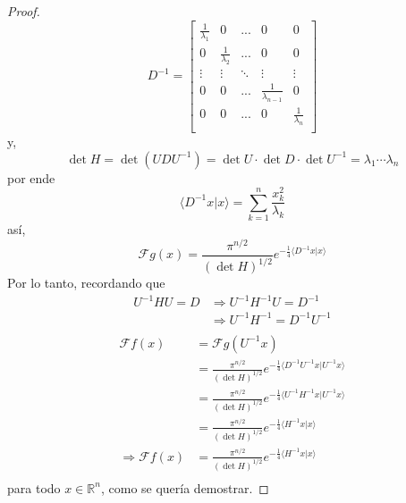 \documentclass[12pt]{report}
\newcounter{it}
\theoremstyle{largebreak}
\newcommand\pint[2]{\ensuremath{\langle#1| #2\rangle}}
\newcommand{\fou}[1]{\ensuremath{\mathcal{F}#1}}
\begin{document}
\begin{proof}
\begin{equation*}
            D^{-1}=\left[
                \begin{array}{ccccc}
                    \frac{1}{\lambda_1} &  0 & ... & 0 & 0\\
                    0 & \frac{1}{\lambda_2} & ... & 0 & 0\\
                    \vdots & \vdots & \ddots & \vdots & \vdots \\
                    0 & 0 & ... & \frac{1}{\lambda_{ n-1}} & 0\\
                    0 & 0 & ... & 0 & \frac{1}{\lambda_n}\\
                \end{array}
             \right]
        \end{equation*}
        y,
        \begin{equation*}
            \det H = \det (UDU^{-1})=\det U\cdot \det D\cdot\det U^{-1}=\lambda_1\cdots\lambda_n
        \end{equation*}
        por ende
        \begin{equation*}
            \pint{D^{-1}x}{x}=\sum_{k=1}^n \frac{x_k^2}{\lambda_k}
        \end{equation*}
        así,
        \begin{equation*}
            \fou{g}(x)=\frac{\pi^{ n/2}}{(\det H)^{1/2}}e^{ -\frac{1}{4}\pint{D^{-1}x}{x}}
        \end{equation*}
        Por lo tanto, recordando que
        \begin{equation*}
            \begin{split}
                U^{-1}HU=D&\Rightarrow U^{-1}H^{-1}U=D^{-1}\\
                &\Rightarrow U^{-1}H^{-1}=D^{-1}U^{-1}\\
            \end{split}
        \end{equation*}
        \begin{equation*}
            \begin{split}
                \fou{f}(x)&=\fou{g}(U^{-1}x)\\
                &=\frac{\pi^{ n/2}}{(\det H)^{1/2}}e^{ -\frac{1}{4}\pint{D^{-1}U^{-1}x}{U^{-1}x}}\\
                &=\frac{\pi^{ n/2}}{(\det H)^{1/2}}e^{ -\frac{1}{4}\pint{U^{-1}H^{-1}x}{U^{-1}x}}\\
                &=\frac{\pi^{ n/2}}{(\det H)^{1/2}}e^{ -\frac{1}{4}\pint{H^{-1}x}{x}}\\
                \Rightarrow \fou{f}(x)&=\frac{\pi^{ n/2}}{(\det H)^{1/2}}e^{ -\frac{1}{4}\pint{H^{-1}x}{x}}\\
            \end{split}
        \end{equation*}
        para todo $x\in\mathbb{R}^n$, como se quería demostrar.
    
    \end{proof}
\end{document}
